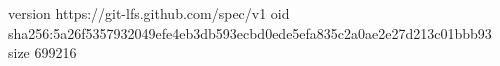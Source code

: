 version https://git-lfs.github.com/spec/v1
oid sha256:5a26f5357932049efe4eb3db593ecbd0ede5efa835c2a0ae2e27d213c01bbb93
size 699216
